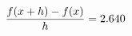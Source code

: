 \documentclass[preview]{standalone}
\begin{document}
\begin{align*}
\special{dvisvgm:raw <g id='unique000'>}\frac{f(x+h)-f(x)}{h} = 2.640\special{dvisvgm:raw </g>}
\end{align*}
\end{document}
